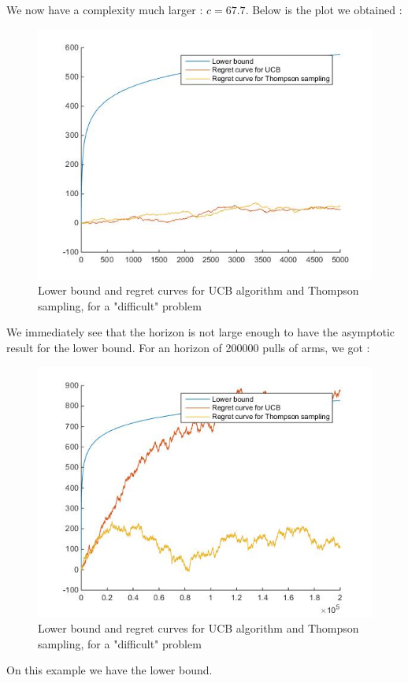 \documentclass[11pt,a4paper]{article}
\begin{document}
We now have a complexity much larger : $c = 67.7$.
Below is the plot we obtained :
\begin{figure}[H]
	\centering
	\noindent\includegraphics[scale=0.4]{regret_thom_diff.jpg}
	\caption{Lower bound and regret curves for UCB algorithm and Thompson sampling, for a "difficult" problem}
\end{figure}

We immediately see that the horizon is not large enough to have the asymptotic result for the lower bound. For an horizon of 200000 pulls of arms, we got :


\begin{figure}[H]
	\centering
	\noindent\includegraphics[scale=0.4]{regret_thom_diff2.jpg}
	\caption{Lower bound and regret curves for UCB algorithm and Thompson sampling, for a "difficult" problem}
\end{figure}

On this example we have the lower bound.
\end{document}
